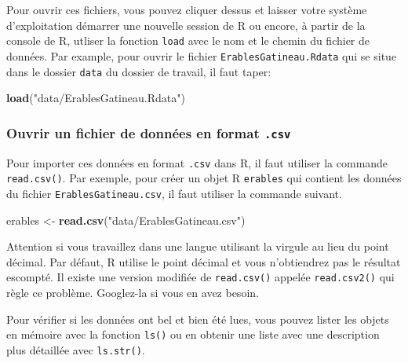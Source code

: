 \documentclass[12pt,]{book}
\makeatletter
\newenvironment{Shaded}{\begin{snugshade}}{\end{snugshade}}
\newcommand{\KeywordTok}[1]{\textcolor[rgb]{0.27,0.27,0.27}{\textbf{#1}}}
\newcommand{\NormalTok}[1]{#1}
\newcommand{\StringTok}[1]{\textcolor[rgb]{0.5,0.5,0.5}{#1}}
\newenvironment{kframe}{%
\medskip{}
\setlength{\fboxsep}{.8em}
 \def\at@end@of@kframe{}%
 \ifinner\ifhmode%
  \def\at@end@of@kframe{\end{minipage}}%
  \begin{minipage}{\columnwidth}%
 \fi\fi%
 \def\FrameCommand##1{\hskip\@totalleftmargin \hskip-\fboxsep
 \colorbox{shadecolor}{##1}\hskip-\fboxsep
     \hskip-\linewidth \hskip-\@totalleftmargin \hskip\columnwidth}%
 \MakeFramed {\advance\hsize-\width
   \@totalleftmargin\z@ \linewidth\hsize
   \@setminipage}}%
 {\par\unskip\endMakeFramed%
 \at@end@of@kframe}
\newenvironment{rmdblock}[1]
  {
  \begin{itemize}
  \renewcommand{\labelitemi}{
    \raisebox{-.7\height}[0pt][0pt]{
      {\setkeys{Gin}{width=3em,keepaspectratio}\texttt{[image: images/\#1]}}
    }
  }
  \setlength{\fboxsep}{1em}
  \begin{kframe}
  \item
  }
  {
  \end{kframe}
  \end{itemize}
  }
\newenvironment{rmdwarning}
  {\begin{rmdblock}{warning}}
  {\end{rmdblock}}
\makeatother
\begin{document}
Pour ouvrir ces fichiers, vous pouvez cliquer dessus et laisser votre système d'exploitation démarrer une nouvelle session de R ou encore, à partir de la console de R, utliser la fonction \texttt{load} avec le nom et le chemin du fichier de données.
Par example, pour ouvrir le fichier \texttt{ErablesGatineau.Rdata} qui se situe dans le dossier \texttt{data} du dossier de travail, il faut taper:

\begin{Shaded}
\begin{Highlighting}[]
\KeywordTok{load}\NormalTok{(}\StringTok{"data/ErablesGatineau.Rdata"}\NormalTok{)}
\end{Highlighting}
\end{Shaded}

\hypertarget{ouvrir-un-fichier-de-donnuxe9es-en-format-.csv}{%
\subsubsection{\texorpdfstring{Ouvrir un fichier de données en format \texttt{.csv}}{Ouvrir un fichier de données en format .csv}}\label{ouvrir-un-fichier-de-donnuxe9es-en-format-.csv}}

Pour importer ces données en format \texttt{.csv} dans R, il faut utiliser la commande \texttt{read.csv()}.
Par exemple, pour créer un objet R \texttt{erables} qui contient les données du fichier \texttt{ErablesGatineau.csv}, il faut utiliser la commande suivant.

\begin{Shaded}
\begin{Highlighting}[]
\NormalTok{erables <-}\StringTok{ }\KeywordTok{read.csv}\NormalTok{(}\StringTok{"data/ErablesGatineau.csv"}\NormalTok{)}
\end{Highlighting}
\end{Shaded}

\begin{rmdwarning}
Attention si vous travaillez dans une langue utilisant la virgule au lieu du point décimal.
Par défaut, R utilise le point décimal et vous n'obtiendrez pas le résultat escompté.
Il existe une version modifiée de \texttt{read.csv()} appelée \texttt{read.csv2()} qui règle ce problème.
Googlez-la si vous en avez besoin.
\end{rmdwarning}

Pour vérifier si les données ont bel et bien été lues, vous pouvez lister les objets en mémoire avec la fonction \texttt{ls()} ou en obtenir une liste avec une description plus détaillée avec \texttt{ls.str()}.
\end{document}
